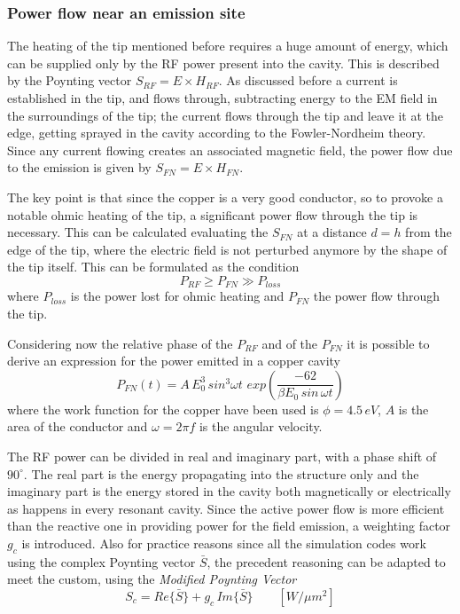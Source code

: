 \subsubsection{Power flow near an emission site}

The heating of the tip mentioned before requires a huge amount of energy, which can be supplied only by the RF power present into the cavity. This is described by the Poynting vector $S_{RF} = E\times H_{RF}$. As discussed before a current is established in the tip, and flows through, subtracting energy to the EM field in the surroundings of the tip; the current flows through the tip and leave it at the edge, getting sprayed in the cavity according to the Fowler-Nordheim theory. Since any current flowing creates an associated magnetic field, the power flow due to the emission is given by $S_{FN}=E\times H_{FN}$. 

The key point is that since the copper is a very good conductor, so to provoke a notable ohmic heating of the tip, a significant power flow through the tip is necessary. This can be calculated evaluating the $S_{FN}$ at a distance $d=h$ from the edge of the tip, where the electric field is not perturbed anymore by the shape of the tip itself. This can be formulated as the condition 
\begin{equation}
P_{RF} \ge P_{FN} \gg P_{loss}
\end{equation}
where $P_{loss}$ is the power lost for ohmic heating and $P_{FN}$ the power flow through the tip.

Considering now the relative phase of the $P_{RF}$ and of the $P_{FN}$ it is possible to derive an expression for the power emitted in a copper cavity
\begin{equation}
P_{FN} (t) = A \, E^3_0 \, sin^3 \omega t \,  \, exp \left ( \frac{-62}{\beta E_0 \, sin \, \omega t} \right )
\end{equation}
where the work function for the copper have been used is $\phi = 4.5 \, eV$, $A$ is the area of the conductor and $\omega = 2 \pi f$ is the angular velocity.

The RF power can be divided in real and imaginary part, with a phase shift of $90^\circ$. The real part is the energy propagating into the structure only and the imaginary part is the energy stored in the cavity both magnetically or electrically as happens in every resonant cavity. Since the active power flow is more efficient than the reactive one in providing power for the field emission, a weighting factor $g_c$ is introduced. Also for practice reasons since all the simulation codes work using the complex Poynting vector $\bar{S}$, the precedent reasoning can be adapted to meet the custom, using the \textit{Modified Poynting Vector}
\begin{equation}
S_c = Re\{ \bar{S} \} + g_c \, Im \{ \bar{S} \} \qquad [W/\mu m^2]
\end{equation} 

